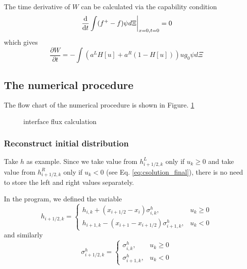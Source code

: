 \documentclass[a4paper]{book}
\begin{document}
The time derivative of $W$ can be calculated via the capability condition
$$\left.\frac{\rm d}{{\rm d}t}\int(f^+-f)\psi d\Xi\right|_{x=0,t=0}=0$$
which gives
\begin{equation} 
    \label{eq:solve_wt}
    \frac{\partial W}{\partial t} = -\int\left(a^LH[u]+a^R(1-H[u])\right)ug_0\psi d\Xi
\end{equation}

\subsection{The numerical procedure}
The flow chart of the numerical procedure is shown in Figure. \ref{pic:flux}

\begin{figure}[htb!]
    \centering
    \caption{interface flux calculation}
    \label{pic:flux}
\end{figure}

\subsubsection*{Reconstruct initial distribution}
Take $h$ as example. Since we take value from $h_{i+1/2,k}^L$ only if $u_k\geqslant 0$ and take value from $h_{i+1/2,k}^R$ only if $u_k <0$ (see Eq. \ref{eq:csolution_final}), there is no need to store the left and right values separately. 

In the program, we defined the variable
$$h_{i+1/2,k} = \begin{cases} h_{i,k}+(x_{i+1/2}-x_i)\sigma_{i,k}^h, & u_k \geqslant 0\\ h_{i+1,k}-(x_{i+1}-x_{i+1/2})\sigma_{i+1,k}^h, & u_k < 0\end{cases}$$
and similarly
$$\sigma_{i+1/2,k}^h = \begin{cases} \sigma_{i,k}^h, & u_k \geqslant 0\\ \sigma_{i+1,k}^h, & u_k < 0\end{cases}$$
\end{document}
